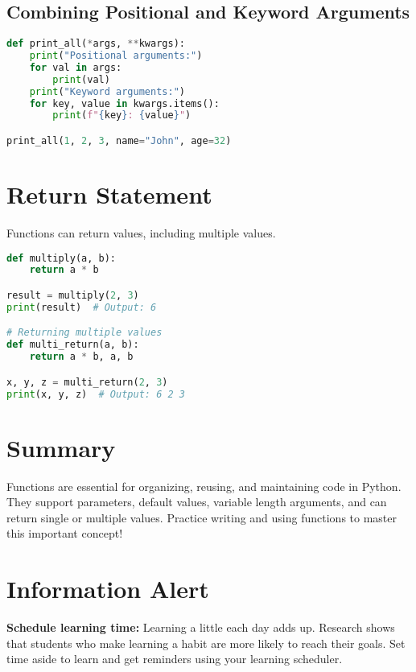 \subsection{Combining Positional and Keyword Arguments}

\begin{lstlisting}[language=Python]
def print_all(*args, **kwargs):
    print("Positional arguments:")
    for val in args:
        print(val)
    print("Keyword arguments:")
    for key, value in kwargs.items():
        print(f"{key}: {value}")

print_all(1, 2, 3, name="John", age=32)
\end{lstlisting}

\section{Return Statement}

Functions can return values, including multiple values.

\begin{lstlisting}[language=Python]
def multiply(a, b):
    return a * b

result = multiply(2, 3)
print(result)  # Output: 6

# Returning multiple values
def multi_return(a, b):
    return a * b, a, b

x, y, z = multi_return(2, 3)
print(x, y, z)  # Output: 6 2 3
\end{lstlisting}

\section{Summary}

Functions are essential for organizing, reusing, and maintaining code in Python.  
They support parameters, default values, variable length arguments, and can return single or multiple values.  
Practice writing and using functions to master this important concept!

\section{Information Alert}

\textbf{Schedule learning time:}  
Learning a little each day adds up. Research shows that students who make learning a habit are more likely to reach their goals.  
Set time aside to learn and get reminders using your learning scheduler.

